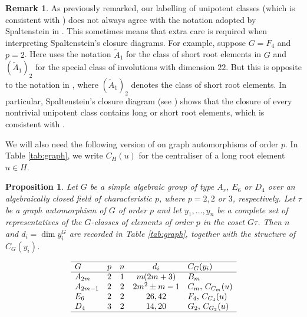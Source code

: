 \documentclass[twoside,a4paper,reqno,11pt]{amsart}
\newcommand{\<}{\langle}
\renewcommand{\>}{\rangle}
\renewcommand{\:}{\colon}
\theoremstyle{plain}
\newtheorem{prop}[thm]{Proposition}
\theoremstyle{definition}
\newtheorem{rem}[thm]{Remark}
\begin{document}
\begin{rem}\label{r:spal}
As previously remarked, our labelling of unipotent classes (which is consistent with \cite{LS_book}) does not always agree with the notation adopted by Spaltenstein in \cite{Spal}. This sometimes means that extra care is required when interpreting Spaltenstein's closure diagrams. For example, suppose $G = F_4$ and $p=2$. Here \cite{LS_book} uses the notation $\tilde{A}_1$ for the class of short root elements in $G$ and $(\tilde{A}_1)_2$ for the special class of involutions with dimension $22$. But this is opposite to the notation in \cite{Spal}, where $(\tilde{A}_1)_2$ denotes the class of short root elements. In particular, Spaltenstein's closure diagram (see \cite[p.250]{Spal}) shows that the closure of every nontrivial unipotent class contains long or short root elements, which is consistent with \cite[Corollary 3.3]{GMal}.
\end{rem}

We will also need the following version of \cite[Proposition 1.4]{LLS1} on graph automorphisms of order $p$. In Table \ref{tab:graph}, we write $C_H(u)$ for the centraliser of a long root element $u \in H$. 

\begin{prop}\label{p:graph}
Let $G$ be a simple algebraic group of type $A_r$, $E_6$ or $D_4$ over an algebraically closed field of characteristic $p$, where $p=2,2$ or $3$, respectively. Let $\tau$ be a graph automorphism of $G$ of order $p$ and let $y_1, \ldots, y_n$ be a complete set of representatives of the $G$-classes of elements of order $p$ in the coset $G\tau$. Then $n$ and $d_i = \dim y_i^G$ are recorded in Table \ref{tab:graph}, together with the structure of $C_G(y_i)$.
\end{prop}

{\small
\begin{table}
\[
\begin{array}{lcccl} \hline
G & p & n & d_i & C_G(y_i) \\ \hline
A_{2m} & 2 & 1 & m(2m+3) & B_m  \\
A_{2m-1} & 2 & 2 & 2m^2 \pm m-1 & C_m, \, C_{C_m}(u) \\ 
E_6 & 2 & 2 & 26, 42 & F_4, \, C_{C_4}(u)  \\
D_4 & 3 & 2 & 14, 20 & G_2, \, C_{G_2}(u)  \\ \hline
\end{array}
\]
\caption{The classes and centralisers of graph automorphisms of order $p$}
\label{tab:graph}
\end{table}}
\end{document}
